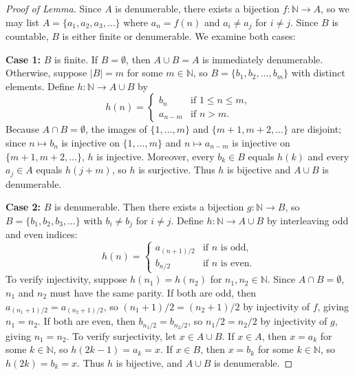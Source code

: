 \documentclass[11pt, letterpaper]{article}
\theoremstyle{definition}
\theoremstyle{remark}
\begin{document}
\begin{proof}[Proof of Lemma]
Since $A$ is denumerable, there exists a bijection $f : \mathbb{N} \to A$, so we may list $A = \{a_1, a_2, a_3, \dots\}$ where $a_n = f(n)$ and $a_i \neq a_j$ for $i \neq j$. Since $B$ is countable, $B$ is either finite or denumerable. We examine both cases:

\textbf{Case 1:} $B$ is finite. If $B = \emptyset$, then $A \cup B = A$ is immediately denumerable. Otherwise, suppose $|B| = m$ for some $m \in \mathbb{N}$, so $B = \{b_1, b_2, \dots, b_m\}$ with distinct elements. Define $h : \mathbb{N} \to A \cup B$ by
\[
h(n) = \begin{cases}
b_n & \text{if } 1 \le n \le m, \\
a_{n-m} & \text{if } n > m.
\end{cases}
\]
Because $A \cap B = \emptyset$, the images of $\{1, \dots, m\}$ and $\{m+1, m+2, \dots\}$ are disjoint; since $n \mapsto b_n$ is injective on $\{1, \dots, m\}$ and $n \mapsto a_{n-m}$ is injective on $\{m+1, m+2, \dots\}$, $h$ is injective. Moreover, every $b_k \in B$ equals $h(k)$ and every $a_j \in A$ equals $h(j+m)$, so $h$ is surjective. Thus $h$ is bijective and $A \cup B$ is denumerable.

\textbf{Case 2:} $B$ is denumerable. Then there exists a bijection $g : \mathbb{N} \to B$, so $B = \{b_1, b_2, b_3, \dots\}$ with $b_i \neq b_j$ for $i \neq j$. Define $h : \mathbb{N} \to A \cup B$ by interleaving odd and even indices:
\[
h(n) = \begin{cases}
a_{(n+1)/2} & \text{if } n \text{ is odd}, \\
b_{n/2} & \text{if } n \text{ is even}.
\end{cases}
\]
To verify injectivity, suppose $h(n_1) = h(n_2)$ for $n_1, n_2 \in \mathbb{N}$. Since $A \cap B = \emptyset$, $n_1$ and $n_2$ must have the same parity. If both are odd, then $a_{(n_1+1)/2} = a_{(n_2+1)/2}$, so $(n_1+1)/2 = (n_2+1)/2$ by injectivity of $f$, giving $n_1 = n_2$. If both are even, then $b_{n_1/2} = b_{n_2/2}$, so $n_1/2 = n_2/2$ by injectivity of $g$, giving $n_1 = n_2$. To verify surjectivity, let $x \in A \cup B$. If $x \in A$, then $x = a_k$ for some $k \in \mathbb{N}$, so $h(2k - 1) = a_k = x$. If $x \in B$, then $x = b_k$ for some $k \in \mathbb{N}$, so $h(2k) = b_k = x$. Thus $h$ is bijective, and $A \cup B$ is denumerable.
\end{proof}
\end{document}
